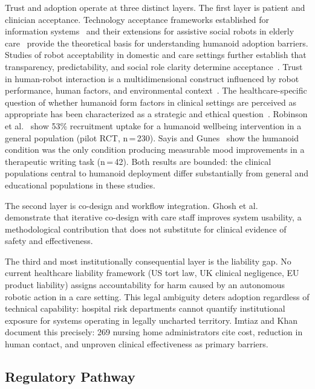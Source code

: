 Trust and adoption operate at three distinct layers. The first layer is patient
and clinician acceptance. Technology acceptance frameworks established for
information systems~\cite{venkatesh2003user} and their extensions for assistive
social robots in elderly care~\cite{heerink2010assessing,broadbent2017interactions}
provide the theoretical basis for understanding humanoid adoption barriers.
Studies of robot acceptability in domestic and care settings further establish
that transparency, predictability, and social role clarity determine
acceptance~\cite{young2009toward}.
Trust in human-robot interaction is a multidimensional construct influenced by
robot performance, human factors, and environmental
context~\cite{hancock2011meta,hancock2011trust,sciutti2018humanizing}. The healthcare-specific question of whether
humanoid form factors in clinical settings are perceived as appropriate has been
characterized as a strategic and ethical
question~\cite{ozturkcan2022humanoid}. Robinson et al.~\cite{robinson2023brief}
show 53\% recruitment uptake for a humanoid wellbeing intervention in a general
population (pilot RCT, n\,=\,230). Sayis and Gunes~\cite{sayis2024technology}
show the humanoid condition was the only condition producing measurable mood
improvements in a therapeutic writing task (n\,=\,42). Both results are bounded:
the clinical populations central to humanoid deployment differ substantially from
general and educational populations in these studies.

The second layer is co-design and workflow integration. Ghosh et
al.~\cite{ghosh2024usercentered} demonstrate that iterative co-design with care
staff improves system usability, a methodological contribution that does not
substitute for clinical evidence of safety and effectiveness.

The third and most institutionally consequential layer is the liability gap. No
current healthcare liability framework (US tort law, UK clinical negligence, EU
product liability) assigns accountability for harm caused by an autonomous
robotic action in a care setting. This legal ambiguity deters adoption regardless
of technical capability: hospital risk departments cannot quantify institutional
exposure for systems operating in legally uncharted territory. Imtiaz and
Khan~\cite{imtiaz2024perceptions} document this precisely: 269 nursing home
administrators cite cost, reduction in human contact, and unproven clinical
effectiveness as primary barriers.

\subsection{Regulatory Pathway}
\label{sec:regulatory}

